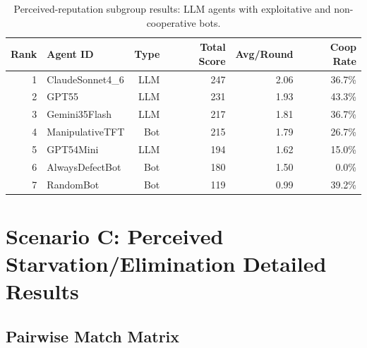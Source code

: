 \documentclass[11pt]{article}
\begin{document}
\begin{table}[H]
\centering
\caption{Perceived-reputation subgroup results: LLM agents with exploitative and non-cooperative bots.}
\label{tab:reputation_subgroup_llm_exploitative}
\begin{tabular}{rlrrrr}
\toprule
Rank & Agent ID & Type & Total Score & Avg/Round & Coop Rate \\
\midrule
1 & ClaudeSonnet4\_6 & LLM & 247 & 2.06 & 36.7\% \\
2 & GPT55 & LLM & 231 & 1.93 & 43.3\% \\
3 & Gemini35Flash & LLM & 217 & 1.81 & 36.7\% \\
4 & ManipulativeTFT & Bot & 215 & 1.79 & 26.7\% \\
5 & GPT54Mini & LLM & 194 & 1.62 & 15.0\% \\
6 & AlwaysDefectBot & Bot & 180 & 1.50 & 0.0\% \\
7 & RandomBot & Bot & 119 & 0.99 & 39.2\% \\
\bottomrule
\end{tabular}
\end{table}


\clearpage
\section{Scenario C: Perceived Starvation/Elimination Detailed Results}
\label{app:starvation_details}

\subsection{Pairwise Match Matrix}
\end{document}
